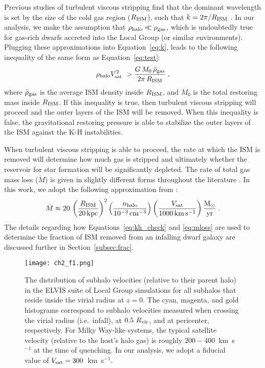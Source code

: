 Previous studies of turbulent viscous stripping find that the dominant
wavelength is set by the size of the cold gas region ($R_{\rm ISM}$),
such that $k = 2\pi / R_{\rm ISM}$ \citep{nulsen82, murray93}.  In our
analysis, we make the assumption that $\rho_{\rm halo} \ll \rho_{\rm
  gas}$, which is undoubtedly true for gas-rich dwarfs accreted into
the Local Group (or similar environments). Plugging these
approximations into Equation~\ref{eq:k}, leads to the following
inequality of the same form as Equation~\ref{eq:test}:
%
\begin{equation}
  \rho_{\rm halo} V_{\rm sat}^{2} \ > \frac{G \, M_{0} \, \bar{\rho}_{\rm
      gas}}{2 \pi \, R_{\rm ISM}}  \; ,
\label{eq:kh_check}
\end{equation}
%
where $\bar{\rho}_{\rm gas}$ is the average ISM density inside $R_{\rm
  ISM}$, and $M_{0}$ is the total restoring mass inside $R_{\rm
  ISM}$. If this inequality is true, then turbulent viscous stripping
will proceed and the outer layers of the ISM will be removed. When
this inequality is false, the gravitational restoring pressure is able
to stabilize the outer layers of the ISM against the K-H instabilities.
%

When turbulent viscous stripping is able to proceed, the rate at which
the ISM is removed will determine how much gas is stripped and
ultimately whether the reservoir for star formation will be
significantly depleted. The rate of total gas mass loss ($\dot{M}$) is
given in slightly different forms throughout the literature
\citep[e.g.][]{nulsen82, mori00, roediger05}. In this work, we adopt
the following approximation from \citet{roediger05}:
%
\begin{equation}
  \dot{M} \approx 20 \, \left (\frac{R_{\rm ISM}}{20 \, {\rm kpc}} \right )^{2}
  \left (\frac{n_{\rm halo}}{10^{-3} \, {\rm cm}^{-3}} \right ) \left
    (\frac{V_{\rm sat}}{1000 \, {\rm km} \, {\rm s}^{-1}} \right )
\frac{{\rm M}_{\odot}}{\rm yr} \; .
\label{eq:mloss}
\end{equation}
%
The details regarding how Equations~\ref{eq:kh_check} and
\ref{eq:mloss} are used to determine the fraction of ISM removed from
an infalling dwarf galaxy are discussed further in
Section~\ref{subsec:frac}. 



\begin{figure}
 \centering
 \hspace*{-0.07in}
 \texttt{[image: ch2\_f1.png]}
 \caption{The distribution of subhalo velocities (relative to their
   parent halo) in the ELVIS suite of Local Group simulations for all
   subhalos that reside inside the virial radius at $z = 0$. The cyan,
   magenta, and gold histograms correspond to
   subhalo velocities measured when crossing the virial radius
   (i.e.~infall), at $0.5~R_{\rm vir}$, and at pericenter,
   respectively. For Milky Way-like systems, the typical satellite
   velocity (relative to the host's halo gas) is roughly
   $200-400$~km~s$^{-1}$ at the time of quenching. In our analysis, we
   adopt a fiducial value of $V_{\rm sat} = 300$~km~s$^{-1}$.}
 \label{fig:vel}
\end{figure}

